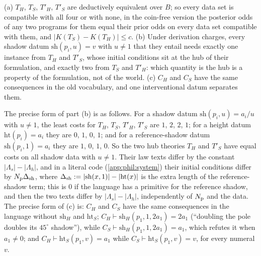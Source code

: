 \begin{proposition}\label{prop:phil:flagpole}
(a) $T_H$, $T_S$, $T'_H$, $T'_S$ are deductively equivalent over $B$; so every data set is compatible with all four or with none, in the coin-free version the posterior odds of any two programs for them equal their prior odds on every data set compatible with them, and $\lvert K(T_S)-K(T_H)\rvert\le c$. (b) Under derivation charges, every shadow datum $\mathrm{sh}(p_i,u)=v$ with $u\ne1$ that they entail needs exactly one instance from $T_H$ and $T'_S$, whose initial conditions sit at the hub of their formulation, and exactly two from $T_S$ and $T'_H$: which quantity is the hub is a property of the formulation, not of the world. (c) $C_H$ and $C_S$ have the same consequences in the old vocabulary, and one interventional datum separates them.
\end{proposition}

The precise form of part (b) is as follows. For a shadow datum $\mathrm{sh}(p_i,u)=a_i/u$ with $u\ne1$, the least costs for $T_H$, $T_S$, $T'_H$, $T'_S$ are $1$, $2$, $2$, $1$; for a height datum $\mathrm{ht}(p_i)=a_i$ they are $0$, $1$, $0$, $1$; and for a reference-shadow datum $\mathrm{sh}(p_i,1)=a_i$ they are $1$, $0$, $1$, $0$. So the two hub theories $T_H$ and $T'_S$ have equal costs on all shadow data with $u\ne1$. Their law texts differ by the constant $\lvert\Lambda_s\rvert-\lvert\Lambda_h\rvert$, and in a literal code (\cref{app:phil:system}) their initial conditions differ by $N_{\rm p}\Delta_{\rm sh}$, where $\Delta_{\rm sh}:=\lvert\mathrm{sh}(x,1)\rvert-\lvert\mathrm{ht}(x)\rvert$ is the extra length of the reference-shadow term; this is $0$ if the language has a primitive for the reference shadow, and then the two texts differ by $\lvert\Lambda_s\rvert-\lvert\Lambda_h\rvert$, independently of $N_{\rm p}$ and the data. The precise form of (c) is: $C_H$ and $C_S$ have the same consequences in the language without $\mathrm{sh}_H$ and $\mathrm{ht}_S$; $C_H\vdash\mathrm{sh}_H(p_1,1,2a_1)=2a_1$ (``doubling the pole doubles its $45^\circ$ shadow''), while $C_S\vdash\mathrm{sh}_H(p_1,1,2a_1)=a_1$, which refutes it when $a_1\ne0$; and $C_H\vdash\mathrm{ht}_S(p_1,v)=a_1$ while $C_S\vdash\mathrm{ht}_S(p_1,v)=v$, for every numeral $v$.

